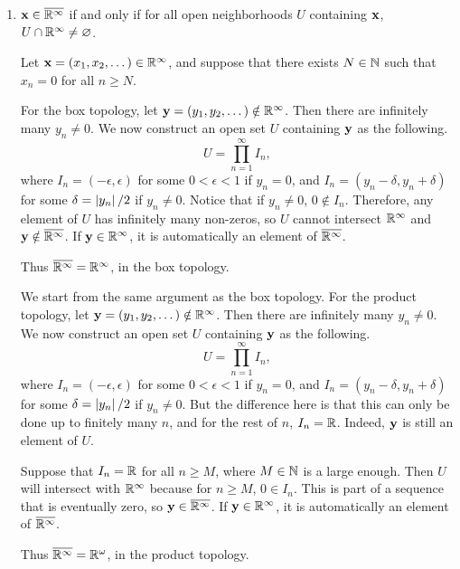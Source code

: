 \documentclass[12pt]{report}
\newcommand{\prob}[1]{\item[\large\textbf{\sffamily #1.}]}
\begin{document}
\begin{enumerate}
    \prob{9} \(\bf{x} \in \cl{\R^\infty}\) if and only if for all open neighborhoods \(U\) containing \(\bf{x}\), \(U \cap \R^\infty \neq \varnothing\).

    Let \(\bf{x} = (x_1, x_2, \dots) \in \R^\infty\), and suppose that there exists \(N \in \N\) such that \(x_n = 0\) for all \(n \geq N\).

    \bigskip

    For the box topology, let \(\bf{y} = (y_1, y_2, \dots) \notin \R^\infty\). Then there are infinitely many \(y_n \neq 0\). We now construct an open set \(U\) containing \(\bf{y}\) as the following.
    \[
        U = \prod_{n=1}^\infty I_n,
    \]
    where \(I_n = (-\epsilon, \epsilon)\) for some \(0 < \epsilon < 1\) if \(y_n = 0\), and \(I_n = (y_n - \delta, y_n + \delta)\) for some \(\delta = \abs{y_n} / 2\) if \(y_n \neq 0\). Notice that if \(y_n \neq 0\), \(0 \notin I_n\). Therefore, any element of \(U\) has infinitely many non-zeros, so \(U\) cannot intersect \(\R^\infty\) and \(\bf{y} \notin \cl{\R^\infty}\). If \(\bf{y} \in \R^\infty\), it is automatically an element of \(\cl{\R^\infty}\).

    Thus \(\cl{\R^\infty} = \R^\infty\), in the box topology.

    \bigskip

    We start from the same argument as the box topology. For the product topology, let \(\bf{y} = (y_1, y_2, \dots) \notin \R^\infty\). Then there are infinitely many \(y_n \neq 0\). We now construct an open set \(U\) containing \(\bf{y}\) as the following.
    \[
        U = \prod_{n=1}^\infty I_n,
    \]
    where \(I_n = (-\epsilon, \epsilon)\) for some \(0 < \epsilon < 1\) if \(y_n = 0\), and \(I_n = (y_n - \delta, y_n + \delta)\) for some \(\delta = \abs{y_n} / 2\) if \(y_n \neq 0\). But the difference here is that this can only be done up to finitely many \(n\), and for the rest of \(n\), \(I_n = \R\). Indeed, \(\bf{y}\) is still an element of \(U\).

    Suppose that \(I_n = \R\) for all \(n \geq M\), where \(M \in \N\) is a large enough. Then \(U\) will intersect with \(\R^\infty\) because for \(n \geq M\), \(0 \in I_n\). This is part of a sequence that is eventually zero, so \(\bf{y} \in \cl{\R^\infty}\). If \(\bf{y} \in \R^\infty\), it is automatically an element of \(\cl{\R^\infty}\).

    Thus \(\cl{\R^\infty} = \R^\omega\), in the product topology.
\end{enumerate}
\end{document}
